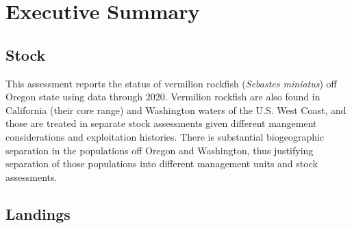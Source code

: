 \documentclass[11pt,
  english,
  a4paper,
]{article}
\begin{document}
\newcommand{\lt}{\ensuremath <}
\newcommand{\gt}{\ensuremath >}

\vspace{500cm}

\pagebreak
{}
\setcounter{page}{1}

\renewcommand{\thetable}{\roman{table}}
\renewcommand{\thefigure}{\roman{figure}}

\setlength\parskip{0.5em plus 0.1em minus 0.2em}


\hypertarget{executive-summary}{%
\section*{Executive Summary}\label{executive-summary}}

\leavevmode\tagmcend\tagstructend


\hypertarget{stock}{%
\subsection*{Stock}\label{stock}}

\leavevmode\tagmcend\tagstructend


This assessment reports the status of vermilion rockfish (\emph{Sebastes miniatus}) off Oregon state using data through 2020. Vermilion rockfish are also found in California (their core range) and Washington waters of the U.S. West Coast, and those are treated in separate stock assessments given different mangement considerations and exploitation histories. There is substantial biogeographic separation in the populations off Oregon and Washington, thus justifying separation of those populations into different management units and stock assessments.

\leavevmode\tagmcend\tagstructend\par


\hypertarget{landings}{%
\subsection*{Landings}\label{landings}}
\end{document}
